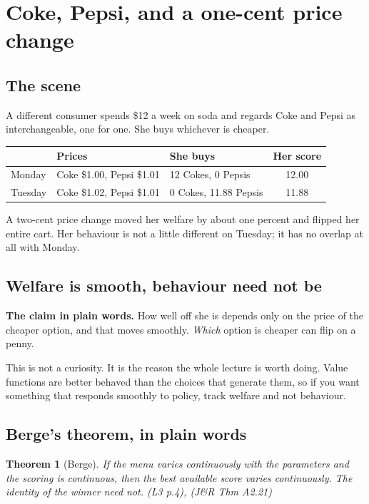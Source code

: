 \documentclass[11pt,letterpaper]{article}
\theoremstyle{definition}
\theoremstyle{plain}
\newtheorem{thm}{Theorem}
\newcommand{\src}[1]{{\small\textsf{(#1)}}}
\begin{document}
\section{Coke, Pepsi, and a one-cent price change}
\label{sec:q4}

\subsection{The scene}

A different consumer spends \$12 a week on soda and regards Coke and Pepsi as interchangeable, one
for one. She buys whichever is cheaper.

\begin{center}
\begin{tabular}{@{}lllc@{}}
\toprule
 & \textbf{Prices} & \textbf{She buys} & \textbf{Her score} \\
\midrule
Monday & Coke \$1.00, Pepsi \$1.01 & 12 Cokes, 0 Pepsis & 12.00 \\
Tuesday & Coke \$1.02, Pepsi \$1.01 & 0 Cokes, 11.88 Pepsis & 11.88 \\
\bottomrule
\end{tabular}
\end{center}

A two-cent price change moved her welfare by about one percent and flipped her entire cart. Her
behaviour is not a little different on Tuesday; it has no overlap at all with Monday.

\subsection{Welfare is smooth, behaviour need not be}

\textbf{The claim in plain words.} How well off she is depends only on the price of the cheaper
option, and that moves smoothly. \emph{Which} option is cheaper can flip on a penny.

This is not a curiosity. It is the reason the whole lecture is worth doing. Value functions are
better behaved than the choices that generate them, so if you want something that responds smoothly
to policy, track welfare and not behaviour.

\subsection{Berge's theorem, in plain words}

\begin{thm}[Berge] If the menu varies continuously with the parameters and the scoring is continuous,
then the best available score varies continuously. The identity of the winner need not.
\src{L3 p.4}, \src{J\&R Thm A2.21}
\end{thm}
\end{document}
